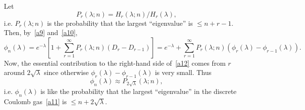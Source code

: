 \documentclass{amsart}
\theoremstyle{definition}
\theoremstyle{remark}
\numberwithin{equation}{section}
\begin{document}
Let
$$
P_r(\lambda;n)=H_r(\lambda;n)/H_r(\lambda),
$$
i.e. $P_r(\lambda;n)$ is the probability that the largest ``eigenvalue''
is $\le n+r-1$. Then, by~\eqref{a9} and~\eqref{a10},
\begin{equation}\label{a12}
\phi_n(\lambda)=e^{-\lambda}[1+\sum_{r=1}^\infty P_r(\lambda;n)
(D_r-D_{r-1})]=e^{-\lambda}+\sum_{r=1}^\infty P_r(\lambda;n)
(\phi_r(\lambda)-\phi_{r-1}(\lambda)).
\end{equation}
Now, the essential contribution to the right-hand side of~\eqref{a12} 
comes from
$r$ around $2\sqrt{\lambda}$ since otherwise 
$\phi_r(\lambda)-\phi_{r-1}(\lambda)$ is very small. Thus
$$
\phi_n(\lambda)\approx P_{2\sqrt{\lambda}}(\lambda;n),
$$
i.e. $\phi_n(\lambda)$ is like the probability that the largest
``eigenvalue'' in the discrete Coulomb gas~\eqref{a11} 
is $\le n+2\sqrt{\lambda}$.
\newline\newline
 
 
 
 
 
 
 


\end{document}
